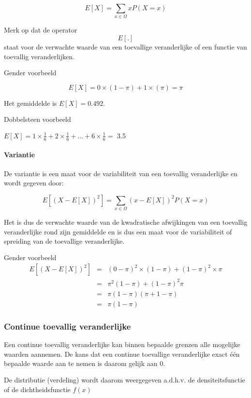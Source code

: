 \documentclass[
  12pt,dutch,coursenotes]{book}
\theoremstyle{definition}
\theoremstyle{definition}
\theoremstyle{definition}
\theoremstyle{remark}
\begin{document}
\[E[X]=\sum\limits_{x\in\Omega} x P(X=x)\]

Merk op dat de operator \[E[.]\] staat voor de verwachte waarde van een toevallige veranderlijke of een functie van toevallig veranderlijken.

Gender voorbeeld

\[E[X]= 0 \times (1-\pi) + 1 \times (\pi) = \pi\]

Het gemiddelde is \(E[X]=0.492\).

Dobbelsteen voorbeeld

\(E[X]= 1 \times \frac{1}{6} + 2 \times \frac{1}{6} + \ldots + 6 \times \frac{1}{6} =\) 3.5

\hypertarget{variantie}{%
\paragraph{Variantie}\label{variantie}}

De variantie is een maat voor de variabiliteit van een toevallig veranderlijke en wordt gegeven door:

\[E[(X-E[X])^2]=\sum\limits_{x\in\Omega} (x-E[X])^2 P(X=x)\]

Het is dus de verwachte waarde van de kwadratische afwijkingen van een toevallig veranderlijke rond zijn gemiddelde en is dus een maat voor de variabiliteit of spreiding van de toevallige veranderlijke.

Gender voorbeeld
\begin{eqnarray}
    E[(X-E[X])^2]&=&(0-\pi)^2\times (1-\pi)+(1-\pi)^2 \times \pi\\
    &=& \pi^2 (1-\pi) + (1-\pi)^2 \pi\\
    &=&\pi (1-\pi)(\pi+1-\pi)\\
    &=&\pi(1-\pi)
    \end{eqnarray}

\hypertarget{continue-toevallig-veranderlijke}{%
\subsubsection{Continue toevallig veranderlijke}\label{continue-toevallig-veranderlijke}}

Een continue toevallig veranderlijke kan binnen bepaalde grenzen alle mogelijke waarden aannemen. De kans dat een continue toevallige veranderlijke exact één bepaalde waarde aan te nemen is daarom gelijk aan 0.

De distributie (verdeling) wordt daarom weergegeven a.d.h.v. de densiteitsfunctie of de dichtheidsfunctie \(f(x)\)
\end{document}
